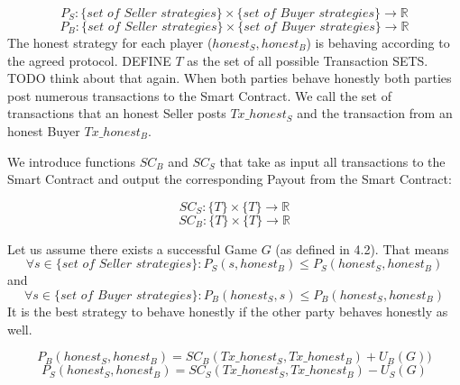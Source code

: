 \documentclass{cacthesis}
\begin{document}
\[P_S : \{ \textit{set of Seller strategies}\} \times \{ \textit{set of Buyer strategies}\} \to \mathbb{R}\]
\[P_B : \{ \textit{set of Seller strategies}\} \times \{ \textit{set of Buyer strategies}\} \to \mathbb{R}\]
The honest strategy for each player ($honest_S, honest_B$) is behaving according to the agreed protocol.
DEFINE $T$ as the set of all possible Transaction SETS. TODO think about that again.\newline
When both parties behave honestly both parties post numerous transactions to the Smart Contract. We call the set of transactions that an honest Seller posts $Tx\_honest_S$ and the transaction from an honest Buyer $Tx\_honest_B$.

We introduce functions $SC_B$ and $SC_S$ that take as input all transactions to the Smart Contract and output the corresponding Payout from the Smart Contract:

\[ SC_S : \{T\} \times \{T\} \to \mathbb{R} \]
\[ SC_B : \{T\} \times \{T\} \to \mathbb{R} \]

Let us assume there exists a successful Game $G$ (as defined in 4.2). That means
\begin{equation}
    \forall s \in \{\textit{set of Seller strategies}\}: P_S(s, honest_B) \leq P_S(honest_S,honest_B)
\end{equation}
and
\begin{equation}
    \forall s \in \{\textit{set of Buyer strategies}\}: P_B(honest_S, s) \leq P_B(honest_S,honest_B)
\end{equation}
It is the best strategy to behave honestly if the other party behaves honestly as well.\newline


\begin{equation}
    P_B(honest_S,honest_B) = SC_B(Tx\_honest_S, Tx\_honest_B) + U_B(G))
\end{equation} 
\begin{equation}
    P_S(honest_S,honest_B) = SC_S(Tx\_honest_S, Tx\_honest_B) - U_S(G) 
\end{equation}
\end{document}
